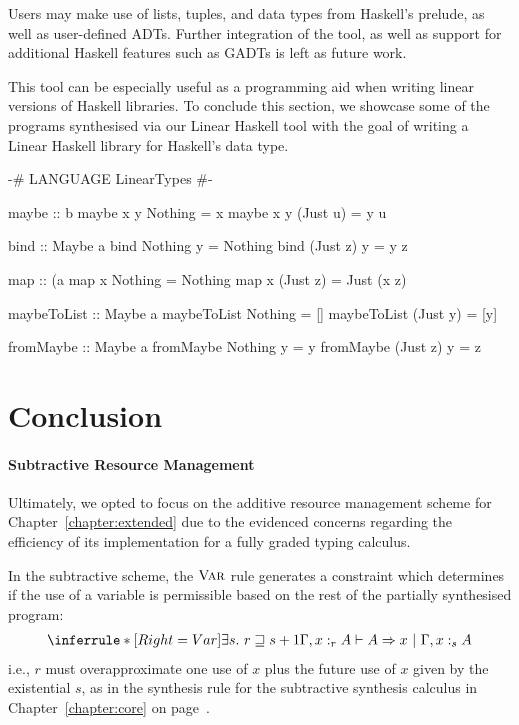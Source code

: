 Users may make use of lists, tuples,  and  data
types from Haskell's prelude, as well as user-defined ADTs. Further integration
of the tool, as well as support for additional Haskell features such as GADTs is
left as future work.

This tool can be especially useful as a programming aid when writing linear
versions of Haskell libraries. To conclude this section, we showcase some of the
programs synthesised via our Linear Haskell tool with the goal of writing a
Linear Haskell library for Haskell's  data type. 

\vspace{1em}
\begin{haskell}
{-# LANGUAGE LinearTypes #-}

maybe :: b %
maybe x y Nothing = x
maybe x y (Just u) = y u

bind :: Maybe a %
bind Nothing y = Nothing
bind (Just z) y = y z

map :: (a %
map x Nothing = Nothing
map x (Just z) = Just (x z)

maybeToList :: Maybe a %
maybeToList Nothing = []
maybeToList (Just y) = [y]

fromMaybe :: Maybe a %
fromMaybe Nothing y = y
fromMaybe (Just z) y = z

\end{haskell}


\section{Conclusion}
\label{section:graded-base-conclusion}

\paragraph{Subtractive Resource Management}
Ultimately, we opted to focus on the additive resource management scheme for
Chapter~\ref{chapter:extended} due to the evidenced concerns regarding the
efficiency of its implementation for a fully graded typing calculus.

In the subtractive scheme, the $\textsc{Var}$ rule generates a constraint which
determines if the use of a variable is permissible based on the rest of the
partially synthesised program:
\begin{align*}
  \inferrule*[Right=Var]
  {\exists s .\ r \sqsupseteq s + 1}
  {\Gamma, x :_{r} A \vdash A \Rightarrow x\ |\ \Gamma, x :_{s} A}
\end{align*}
i.e., $r$ must overapproximate one use of $x$ plus the future use of
$x$ given by the existential $s$, as in the synthesis rule for the subtractive
synthesis calculus in Chapter~\ref{chapter:core} on page~\pageref{sub:grVar}.

